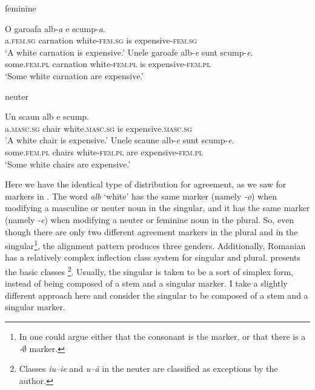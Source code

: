     \begin{exe}
    \ex feminine
    \begin{xlist}
        \ex 
        \gll O garoafa alb-\textit{a} e scump-\textit{a}.\\
        a.\textsc{fem.sg} carnation white-\textsc{fem.sg} is expensive-\textsc{fem.sg}\\
        \glt `A white carnation is expensive.'
        \ex 
        \gll Unele garoafe alb-\textit{e} sunt scump-\textit{e}.\\
        some.\textsc{fem.pl} carnation white-\textsc{fem.pl} is expensive-\textsc{fem.pl}\\
        \glt `Some white carnation are expensive.'
    \end{xlist}

    \ex \label{romanian-neut-exe} neuter
    \begin{xlist}
        \ex 
        \gll Un scaun alb e scump.\\
        a.\textsc{masc.sg} chair white.\textsc{masc.sg} is expensive.\textsc{masc.sg}\\
        \glt 'A white chair is expensive.'
        \ex 
        \gll Unele scaune alb-\textit{e} sunt scump-\textit{e}.\\
        some.\textsc{fem.pl} chairs white-\textsc{fem.pl} are expensive-\textsc{fem.pl}\\
        \glt `Some white chairs are expensive.'
    \end{xlist}
\end{exe}

Here we have the identical type of distribution for agreement, as we saw for markers in . The word \textit{alb} `white' has the same marker (namely \textit{-ø}) when modifying a masculine or neuter noun in the singular, and it has the same marker (namely \textit{-e}) when modifying a neuter or feminine noun in the plural. So, even though there are only two different agreement markers in the plural and in the singular\footnote{In  one could argue either that the consonant is the marker, or that there is a \textit{-$\emptyset$} marker.}, the alignment pattern produces three genders. Additionally, Romanian has a relatively complex inflection class system for singular and plural.  presents the basic classes \autocite{Cojocaru.2003}\footnote{Classes \textit{iu--ie} and \textit{u--ă} in the neuter are classified as exceptions by the author.}. Usually, the singular is taken to be a sort of simplex form, instead of being composed of a stem and a singular marker. I take a slightly different approach here and consider the singular to be composed of a stem and a singular marker.

